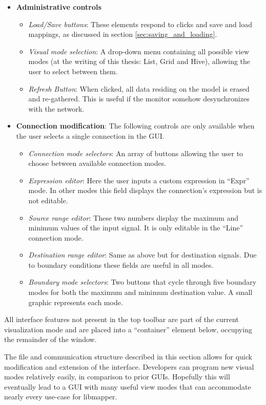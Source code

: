 \begin{itemize}
	\item \textbf{Administrative controls}
	\begin{itemize}
		\item\emph{Load/Save buttons}: These elements respond to clicks and save and load mappings, as discussed in section \ref{sec:saving_and_loading}.
		\item\emph{Visual mode selection}: A drop-down menu containing all possible view modes (at the writing of this thesis: List, Grid and Hive), allowing the user to select between them.
		\item\emph{Refresh Button}: When clicked, all data residing on the model is erased and re-gathered. This is useful if the monitor somehow desynchronizes with the network.
	\end{itemize}

	\item \textbf{Connection modification}: The following controls are only available when the user selects a single connection in the GUI.
	\begin{itemize}
		\item\emph{Connection mode selectors}: An array of buttons allowing the user to choose between available connection modes.
		\item\emph{Expression editor}: Here the user inputs a custom expression in ``Expr'' mode. In other modes this field displays the connection's expression but is not editable.
		\item\emph{Source range editor}: These two numbers display the maximum and minimum values of the input signal. It is only editable in the ``Line'' connection mode.
		\item\emph{Destination range editor}: Same as above but for destination signals. Due to boundary conditions these fields are useful in all modes.
		\item\emph{Boundary mode selectors}: Two buttons that cycle through five boundary modes for both the maximum and minimum destination value. A small graphic represents each mode.
	\end{itemize}
\end{itemize}

All interface features not present in the top toolbar are part of the current visualization mode and are placed into a ``container'' element below, occupying the remainder of the window.


The file and communication structure described in this section allows for quick modification and extension of the interface. Developers can program new visual modes relatively easily, in comparison to prior GUIs. Hopefully this will eventually lead to a GUI with many useful view modes that can accommodate nearly every use-case for libmapper.

